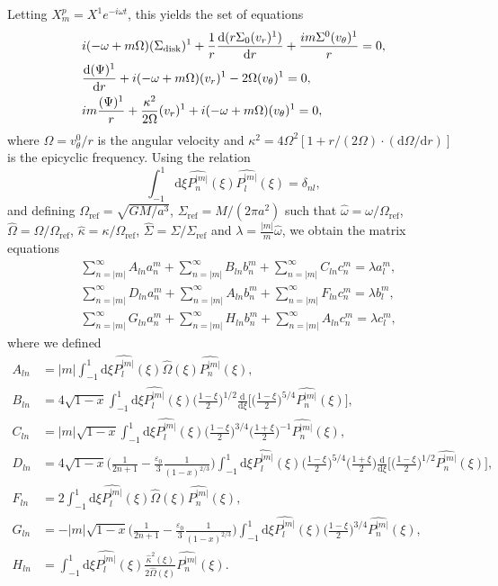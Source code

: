 \documentclass[11pt]{article}
\newcommand{\rd}{\mathrm{d}}
\newcommand{\vr}{v_{r}}
\newcommand{\vt}{v_{\theta}}
\newcommand{\Sigmad}{\Sigma_{\rm{disk}}}
\newcommand{\anm}{a_n^m}
\newcommand{\bnm}{b_n^m}
\newcommand{\cnm}{c_n^m}
\newcommand{\alm}{a_l^m}
\newcommand{\blm}{b_l^m}
\newcommand{\clm}{c_l^m}
\newcommand{\Pnm}{P_n^{|m|}}
\newcommand{\Plm}{P_l^{|m|}}
\newcommand{\hPnm}{\widehat{\Pnm}}
\newcommand{\hPlm}{\widehat{\Plm}}
\newcommand{\homega}{\widehat{\omega}}
\newcommand{\hOmega}{\widehat{\Omega}}
\newcommand{\Omegaref}{\Omega_{\mathrm{ref}}}
\newcommand{\hkappa}{\widehat{\kappa}}
\newcommand{\Sigmaref}{\Sigma_{\mathrm{ref}}}
\newcommand{\hSigma}{\widehat{\Sigma}}
\begin{document}
Letting $X_m^p = X^1  e^{-i \omega t}$, this yields the set of equations
\begin{align}
&i(-\omega + m \Omega)(\Sigmad)^1 + \frac{1}{r} \frac{\rd (r\Sigma_0 (\vr)^1)}{\rd r} + \frac{im\Sigma^0 (\vt)^1}{r} = 0,\\
&\frac{\rd (\Psi)^1}{\rd r} + i(-\omega + m \Omega)(\vr)^1 - 2 \Omega (\vt)^1 = 0,\\
&i m \frac{(\Psi)^1}{r} + \frac{\kappa^2}{2\Omega} (\vr)^1 + i(-\omega + m \Omega)(\vt)^1 = 0,
\end{align}
where $\Omega = \vt^0/r$ is the angular velocity and $\kappa^2=4\Omega^2[1+r/(2\Omega)\cdot(\rd \Omega /\rd r)]$ is the epicyclic frequency. Using the relation 
$$\int_{-1}^{1} \rd \xi \hPnm(\xi)\hPlm(\xi) = \delta_{nl},$$
and defining $\Omegaref=\sqrt{GM/a^3 }$, $\Sigmaref=M/(2\pi a^2)$   such that $\homega = \omega/\Omegaref$, $\hOmega = \Omega/\Omegaref$, $\hkappa = \kappa/\Omegaref$, $\hSigma=\Sigma/\Sigmaref$ and $\lambda=\frac{|m|}{m}\homega$, we obtain the matrix equations
\begin{align}
&\sum_{n=|m|}^{\infty}  A_{ln} \anm  +\sum_{n=|m|}^{\infty}  B_{ln}\bnm+\sum_{n=|m|}^{\infty}  C_{ln}\cnm= \lambda \alm ,\\
&\sum_{n=|m|}^{\infty}D_{ln}\anm + \sum_{n=|m|}^{\infty}   A_{ln} \bnm+  \sum_{n=|m|}^{\infty} F_{ln} \cnm  =  \lambda    \blm ,\\
&\sum_{n=|m|}^{\infty}G_{ln}\anm + \sum_{n=|m|}^{\infty}   H_{ln} \bnm+  \sum_{n=|m|}^{\infty} A_{ln} \cnm  =  \lambda    \clm ,
 \end{align}
where we defined
\begin{align}
A_{ln} &= |m| \int_{-1}^{1} \rd \xi  \hPlm(\xi)\hOmega(\xi)\hPnm(\xi) , \\
B_{ln} &= 4 {\sqrt{1-x}} \int_{-1}^{1} \rd \xi  \hPlm(\xi) \bigg(\frac{1-\xi}{2}\bigg)^{1/2} \frac{\rd}{\rd \xi} \bigg[\bigg(\frac{1-\xi}{2}\bigg)^{5/4}\hPnm(\xi)\bigg], \\
C_{ln} &= |m| {\sqrt{1-x}}\int_{-1}^{1} \rd \xi \hPlm(\xi) \bigg(\frac{1-\xi}{2}\bigg)^{3/4}\bigg(\frac{1+\xi}{2}\bigg)^{-1}   \hPnm(\xi), \\
D_{ln} &= 4{\sqrt{1-x}} \bigg(\frac{1}{2n+1}-\frac{\varepsilon_0}{3}  \frac{1}{(1-x)^{2/3}} \bigg) \int_{-1}^{1} \rd \xi \hPlm(\xi)  \bigg(\frac{1-\xi}{2}\bigg)^{5/4} \bigg(\frac{1+\xi}{2}\bigg) 
\frac{\rd}{\rd \xi} \bigg[ \bigg(\frac{1-\xi}{2}\bigg)^{1/2}\hPnm(\xi) \bigg] ,\\
F_{ln} &=2 \int_{-1}^{1} \rd \xi  \hPlm(\xi)\hOmega(\xi)\hPnm(\xi) , \\
G_{ln} &= -|m|{\sqrt{1-x}} \bigg(\frac{1}{2n+1}-\frac{\varepsilon_0}{3}  \frac{1}{(1-x)^{2/3}}  \bigg)  \int_{-1}^{1} \rd \xi \hPlm(\xi)  \bigg(\frac{1-\xi}{2}\bigg)^{3/4} 
\hPnm(\xi)  ,\\
H_{ln} &= \int_{-1}^{1} \rd \xi  \hPlm(\xi)\frac{\hkappa^2(\xi)}{2\hOmega(\xi)}\hPnm(\xi) .
\end{align}
\end{document}
